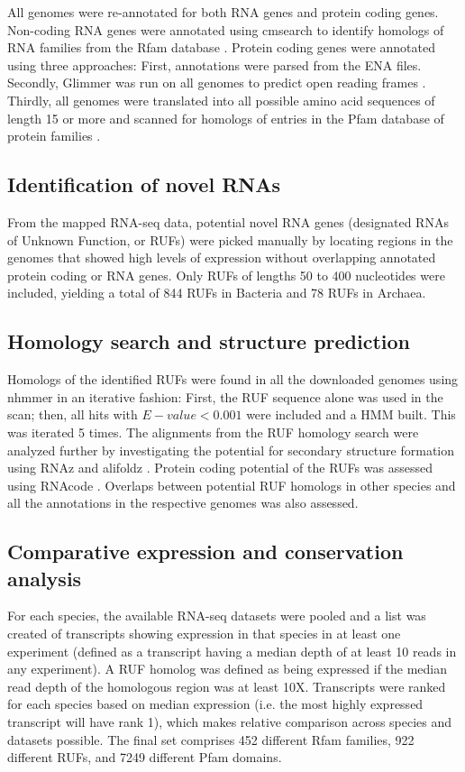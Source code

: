 \documentclass[10pt]{article}
\begin{document}
All genomes were re-annotated for both RNA genes and protein coding
genes. Non-coding RNA genes were annotated using cmsearch
\cite{Nawrocki:2013} to identify homologs of RNA families from the
Rfam database \cite{Gardner:2011,Burge:2013}. Protein coding genes
were annotated using three approaches: First, annotations were parsed
from the ENA files. Secondly, Glimmer was run on all genomes to
predict open reading frames \cite{Delcher:2007}. Thirdly, all genomes
were translated into all possible amino acid sequences of length 15 or
more and scanned for homologs of entries in the Pfam database of
protein families \cite{Punta:2012,Finn:2014}.

\subsection*{Identification of novel RNAs}

From the mapped RNA-seq data, potential novel RNA genes (designated
RNAs of Unknown Function, or RUFs) were picked manually by locating
regions in the genomes that showed high levels of expression without
overlapping annotated protein coding or RNA genes. Only RUFs of
lengths 50 to 400 nucleotides were included, yielding a total of 844
RUFs in Bacteria and 78 RUFs in Archaea.

\subsection*{Homology search and structure prediction}

Homologs of the identified RUFs were found in all the downloaded
genomes using nhmmer \cite{Wheeler:2013} in an iterative fashion:
First, the RUF sequence alone was used in the scan; then, all hits
with $E-value<0.001$ were included and a HMM built. This was iterated
5 times. The alignments from the RUF homology search were analyzed
further by investigating the potential for secondary structure
formation using RNAz \cite{Gruber:2010} and alifoldz
\cite{Washietl:2004}. Protein coding potential of the RUFs was
assessed using RNAcode \cite{Washietl:2011}. Overlaps between
potential RUF homologs in other species and all the annotations in the
respective genomes was also assessed.

\subsection*{Comparative expression and conservation analysis}

For each species, the available RNA-seq datasets were pooled and a
list was created of transcripts showing expression in that species in
at least one experiment (defined as a transcript having a median depth
of at least 10 reads in any experiment). A RUF homolog was defined as
being expressed if the median read depth of the homologous region was
at least 10X. Transcripts were ranked for each species based on median
expression (i.e. the most highly expressed transcript will have rank
1), which makes relative comparison across species and datasets
possible. The final set comprises 452 different Rfam families, 922
different RUFs, and 7249 different Pfam domains.
\end{document}

